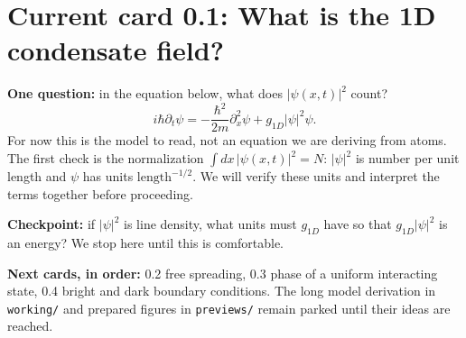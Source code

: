 \section{Current card 0.1: What is the 1D condensate field?}

\noindent\textbf{One question:} in the equation below, what does $|\psi(x,t)|^2$ count?
\[
i\hbar\partial_t\psi=-\frac{\hbar^2}{2m}\partial_x^2\psi
+g_{1D}|\psi|^2\psi.
\]
For now this is the model to read, not an equation we are deriving from atoms. The first check is the normalization $\int dx\,|\psi(x,t)|^2=N$: $|\psi|^2$ is number per unit length and $\psi$ has units $\mathrm{length}^{-1/2}$. We will verify these units and interpret the terms together before proceeding.

\noindent\textbf{Checkpoint:} if $|\psi|^2$ is line density, what units must $g_{1D}$ have so that $g_{1D}|\psi|^2$ is an energy? We stop here until this is comfortable.

\noindent\textbf{Next cards, in order:} 0.2 free spreading, 0.3 phase of a uniform interacting state, 0.4 bright and dark boundary conditions. The long model derivation in \texttt{working/} and prepared figures in \texttt{previews/} remain parked until their ideas are reached.
